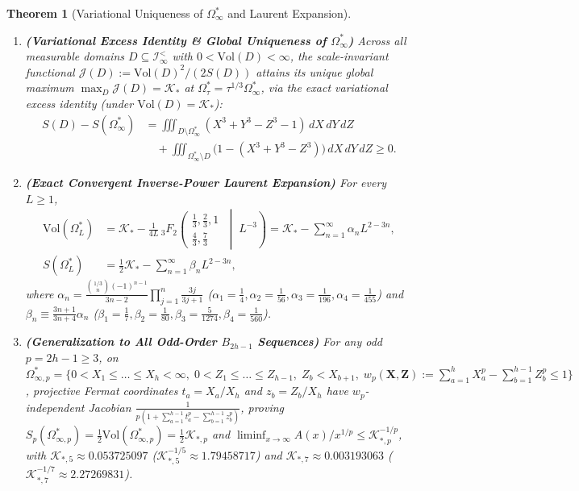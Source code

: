 \documentclass[11pt,a4paper]{article}
\newtheorem{theorem}{Theorem}[section]
\theoremstyle{remark}
\begin{document}
\begin{theorem}[Variational Uniqueness of $\Omega_\infty^*$ and Laurent Expansion]
\begin{enumerate}
  \item \textbf{(Variational Excess Identity \& Global Uniqueness of $\Omega_\infty^*$)} Across all measurable domains $D \subseteq \mathcal{I}_\infty^{<}$ with $0 < \mathrm{Vol}(D) < \infty$, the scale-invariant functional $\mathcal{J}(D) := \mathrm{Vol}(D)^2 / (2 S(D))$ attains its unique global maximum $\max_{D} \mathcal{J}(D) = \mathcal{K}_*$ at $\Omega_\tau^* = \tau^{1/3}\Omega_\infty^*$, via the exact variational excess identity (under $\mathrm{Vol}(D) = \mathcal{K}_*$):
  \begin{align*}
    S(D) - S(\Omega_\infty^*) &= \iiint_{D \setminus \Omega_\infty^*} (X^3 + Y^3 - Z^3 - 1)\,dX\,dY\,dZ \\
    &\quad + \iiint_{\Omega_\infty^* \setminus D} \bigl(1 - (X^3 + Y^3 - Z^3)\bigr)\,dX\,dY\,dZ \ge 0.
  \end{align*}
  \item \textbf{(Exact Convergent Inverse-Power Laurent Expansion)} For every $L \ge 1$,
  \begin{align*}
    \mathrm{Vol}(\Omega_L^*) &= \mathcal{K}_* - \frac{1}{4 L}\,{}_3F_2\left(\begin{matrix}\tfrac{1}{3}, \tfrac{2}{3}, 1 \\ \tfrac{4}{3}, \tfrac{7}{3}\end{matrix}\;\middle|\;L^{-3}\right) = \mathcal{K}_* - \sum_{n=1}^\infty \alpha_n L^{2 - 3n}, \\
    S(\Omega_L^*) &= \frac{1}{2}\mathcal{K}_* - \sum_{n=1}^\infty \beta_n L^{2 - 3n},
  \end{align*}
  where $\alpha_n = \frac{\binom{1/3}{n}(-1)^{n-1}}{3n - 2} \prod_{j=1}^n \frac{3j}{3j+1}$ ($\alpha_1 = \frac{1}{4}, \alpha_2 = \frac{1}{56}, \alpha_3 = \frac{1}{196}, \alpha_4 = \frac{1}{455}$) and $\beta_n \equiv \frac{3n+1}{3n+4}\alpha_n$ ($\beta_1 = \frac{1}{7}, \beta_2 = \frac{1}{80}, \beta_3 = \frac{5}{1274}, \beta_4 = \frac{1}{560}$).
  \item \textbf{(Generalization to All Odd-Order $B_{2h-1}$ Sequences)} For any odd $p = 2h - 1 \ge 3$, on $\Omega_{\infty, p}^* = \{0 < X_1 \le \dots \le X_h < \infty,\; 0 < Z_1 \le \dots \le Z_{h-1},\; Z_b < X_{b+1},\; w_p(\mathbf{X}, \mathbf{Z}) := \sum_{a=1}^h X_a^p - \sum_{b=1}^{h-1} Z_b^p \le 1\}$, projective Fermat coordinates $t_a = X_a / X_h$ and $z_b = Z_b / X_h$ have $w_p$-independent Jacobian $\frac{1}{p(1 + \sum_{a=1}^{h-1} t_a^p - \sum_{b=1}^{h-1} z_b^p)}$, proving $S_p(\Omega_{\infty, p}^*) = \frac{1}{2}\mathrm{Vol}(\Omega_{\infty, p}^*) = \frac{1}{2}\mathcal{K}_{*, p}$ and $\liminf_{x\to\infty} A(x)/x^{1/p} \le \mathcal{K}_{*, p}^{-1/p}$, with $\mathcal{K}_{*, 5} \approx 0.053725097$ ($\mathcal{K}_{*, 5}^{-1/5} \approx 1.79458717$) and $\mathcal{K}_{*, 7} \approx 0.003193063$ ($\mathcal{K}_{*, 7}^{-1/7} \approx 2.27269831$).
\end{enumerate}
\end{theorem}
\end{document}
